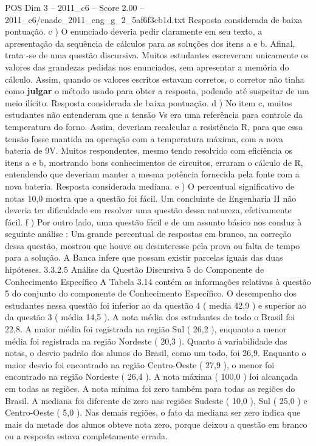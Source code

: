 \begin{textsample}{POS Dim 3 – 2011\_c6 – Score 2.00 – 2011\_c6/enade\_2011\_eng\_g\_2\_5af6f3cb1d.txt}
Resposta considerada de baixa pontuação. c ) O enunciado deveria pedir claramente em seu texto, a apresentação da sequência de cálculos para as soluções dos itens a e b.
Afinal, trata -se de uma questão discursiva.
Muitos estudantes escreveram unicamente os valores das grandezas pedidas nos enunciados, sem apresentar a memória do cálculo.
Assim, quando os valores escritos estavam corretos, o corretor não tinha como \textbf{julgar} o método usado para obter a resposta, podendo até suspeitar de um meio ilícito.
Resposta considerada de baixa pontuação. d ) No item c, muitos estudantes não entenderam que a tensão Vs era uma referência para controle da temperatura do forno.
Assim, deveriam recalcular a resistência R, para que essa tensão fosse mantida na operação com a temperatura máxima, com a nova bateria de 9V.
Muitos respondentes, mesmo tendo resolvido com eficiência os itens a e b, mostrando bons conhecimentos de circuitos, erraram o cálculo de R, entendendo que deveriam manter a mesma potência fornecida pela fonte com a nova bateria.
Resposta considerada mediana. e ) O percentual significativo de notas 10,0 mostra que a questão foi fácil.
Um concluinte de Engenharia II não deveria ter dificuldade em resolver uma questão dessa natureza, efetivamente fácil. f ) Por outro lado, uma questão fácil e de um assunto básico nos conduz à seguinte análise : Um grande percentual de respostas em branco, na correção dessa questão, mostrou que houve ou desinteresse pela prova ou falta de tempo para a solução.
A Banca infere que possam existir parcelas iguais das duas hipóteses. 3.3.2.5 Análise da Questão Discursiva 5 do Componente de Conhecimento Específico A Tabela 3.14 contém as informações relativas à questão 5 do conjunto do componente de Conhecimento Específico.
O desempenho dos estudantes nessa questão foi inferior ao da questão 4 ( media 42,9 ) e superior ao da questão 3 ( média 14,5 ).
A nota média dos estudantes de todo o Brasil foi 22,8.
A maior média foi registrada na região Sul ( 26,2 ), enquanto a menor média foi registrada na região Nordeste ( 20,3 ).
Quanto à variabilidade das notas, o desvio padrão dos alunos do Brasil, como um todo, foi 26,9.
Enquanto o maior desvio foi encontrado na região Centro-Oeste ( 27,9 ), o menor foi encontrado na região Nordeste ( 26,4 ).
A nota máxima ( 100,0 ) foi alcançada em todas as regiões.
A nota mínima foi zero também para todas as regiões do Brasil.
A mediana foi diferente de zero nas regiões Sudeste ( 10,0 ), Sul ( 25,0 ) e Centro-Oeste ( 5,0 ).
Nas demais regiões, o fato da mediana ser zero indica que mais da metade dos alunos obteve nota zero, porque deixou a questão em branco ou a resposta estava completamente errada.

\end{textsample}
